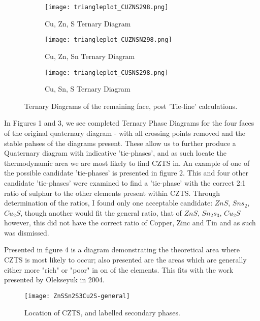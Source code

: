 \begin{figure}
\centering
\begin{subfigure}{80mm}
  \centering
    \texttt{[image: triangleplot\_CUZNS298.png]}
    \caption{Cu, Zn, S Ternary Diagram}
    \label{fig:CuZnS}
\end{subfigure}%
\begin{subfigure}{80mm}
 \centering
    \texttt{[image: triangleplot\_CUZNSN298.png]}
    \caption{Cu, Zn, Sn Ternary Diagram}
    \label{fig:CuZnSn}
\end{subfigure}
\begin{subfigure}{80mm}
 \centering
    \texttt{[image: triangleplot\_CUSNS298.png]}
    \caption{Cu, Sn, S Ternary Diagram}
    \label{fig:CuSnS}
\end{subfigure}
\caption{Ternary Diagrams of the remaining face, post 'Tie-line' calculations.}
\label{fig:RemainingFaces}
\end{figure}

In Figures 1 and 3, we see completed Ternary Phase Diagrams for the four faces of the original quaternary diagram - with all crossing points removed and the stable pahses of the diagrams present.
These allow us to further produce a Quaternary diagram with indicative 'tie-phases', and as such locate the thermodynamic area we are most likely to find CZTS in. An example of one of the possible candidate 'tie-phases' is presented in figure 2. This and four other candidate 'tie-phases' were examined to find a 'tie-phase' with the correct 2:1 ratio of sulphur to the other elements present within CZTS. Through determination of the ratios, I found only one acceptable candidate: $ZnS$, $Sns_2$, $Cu_2S$, though another would fit the general ratio, that of $ZnS$, $Sn_2s_3$, $Cu_2S$ however, this did not have the correct ratio of Copper, Zinc and Tin and as such was dismissed.

Presented in figure 4 is a diagram demonstrating the theoretical area where CZTS is most likely to occur; also presented are the areas which are generally either more "rich" or "poor" in on of the elements. This fits with the work presented by Olekseyuk in 2004.\citep{olekseyuk_phase_2004}

\begin{figure}
\centering
 \texttt{[image: ZnSSn2S3Cu2S-general]}
    \caption{Location of CZTS, and labelled secondary phases.}
    \label{fig:ZnSSn2S3Cu2S}
\end{figure}
